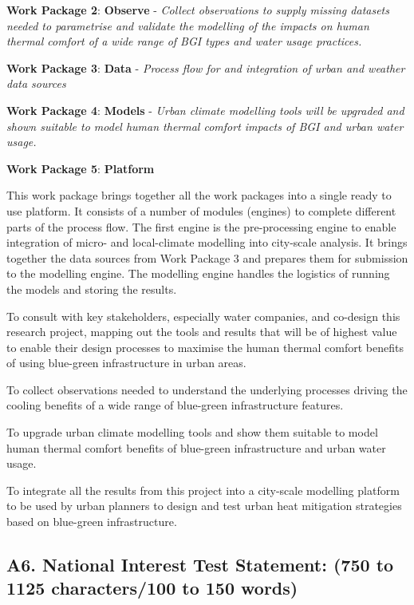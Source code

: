 \textbf{Work Package 2}: \textbf{Observe} - \emph{Collect observations to supply missing datasets needed to parametrise and validate the modelling of the impacts on human thermal comfort of a wide range of BGI types and water usage practices.}

\textbf{Work Package 3}: \textbf{Data} - \emph{Process flow for and integration of urban and weather data sources  }

\textbf{Work Package 4}: \textbf{Models} - \emph{Urban climate modelling tools will be upgraded and shown suitable to model human thermal comfort impacts of BGI and urban water usage.  }

\textbf{Work Package 5}: \textbf{Platform} \emph{  }

This work package brings together all the work packages into a single ready to use platform. It consists of a number of modules (engines) to complete different parts of the process flow. The first engine is the pre-processing engine to enable integration of micro- and local-climate modelling into city-scale analysis. It brings together the data sources from Work Package 3 and prepares them for submission to the modelling engine. The modelling engine handles the logistics of running the models and storing the results. 




To consult with key stakeholders, especially water companies, and co-design this research project, mapping out the tools and results that will be of highest value to enable their design processes to maximise the human thermal comfort benefits of using blue-green infrastructure in urban areas.

To collect observations needed to understand the underlying processes driving the cooling benefits of a wide range of blue-green infrastructure features.

To upgrade urban climate modelling tools and show them suitable to model human thermal comfort benefits of blue-green infrastructure and urban water usage.

To integrate all the results from this project into a city-scale modelling platform to be used by urban planners to design and test urban heat mitigation strategies based on blue-green infrastructure.


\subsection*{\TitleFont A6. National Interest Test Statement: (750 to 1125 characters/100 to 150 words) }


